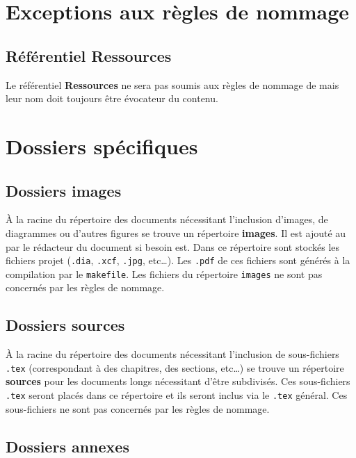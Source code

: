 \section{Exceptions aux règles de nommage}

\subsection{Référentiel Ressources}

Le référentiel \textbf{Ressources} ne sera pas soumis aux règles de nommage de \nomEquipe mais leur nom doit toujours être évocateur du contenu.

\section{Dossiers spécifiques}

\subsection{Dossiers images}

\`{A} la racine du répertoire des documents nécessitant l'inclusion d'images, de diagrammes ou
d'autres figures se trouve un répertoire \textbf{images}. Il est ajouté au \git{} par le
rédacteur du document si besoin est. Dans ce répertoire sont stockés les fichiers projet
(\verb+.dia+, \verb+.xcf+, \verb+.jpg+, etc\dots). Les \verb+.pdf+ de ces fichiers sont générés
à la compilation par le \verb+makefile+.
Les fichiers du répertoire \verb+images+ ne sont pas concernés par les règles de nommage.

\subsection{Dossiers sources}

\`{A} la racine du répertoire des documents nécessitant l'inclusion de sous-fichiers \verb+.tex+
(correspondant à des chapitres, des sections, etc\dots) se trouve un répertoire \textbf{sources} pour
les documents longs nécessitant d'être subdivisés. 
Ces sous-fichiers \verb+.tex+ seront placés dans ce répertoire et ils seront inclus via
le \verb+.tex+ général. Ces sous-fichiers ne sont pas concernés par les règles de nommage.

\subsection{Dossiers annexes}


